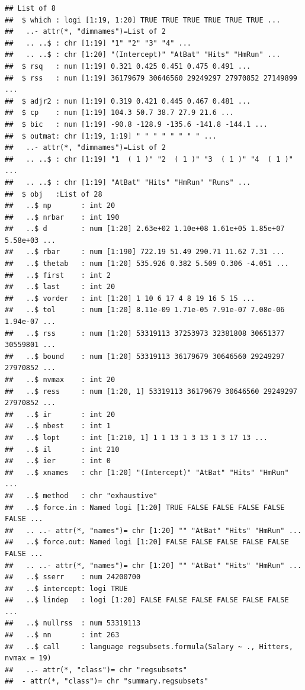 \documentclass[
  12pt,
]{book}
\theoremstyle{definition}
\theoremstyle{definition}
\theoremstyle{definition}
\theoremstyle{remark}
\begin{document}
\begin{verbatim}
## List of 8
##  $ which : logi [1:19, 1:20] TRUE TRUE TRUE TRUE TRUE TRUE ...
##   ..- attr(*, "dimnames")=List of 2
##   .. ..$ : chr [1:19] "1" "2" "3" "4" ...
##   .. ..$ : chr [1:20] "(Intercept)" "AtBat" "Hits" "HmRun" ...
##  $ rsq   : num [1:19] 0.321 0.425 0.451 0.475 0.491 ...
##  $ rss   : num [1:19] 36179679 30646560 29249297 27970852 27149899 ...
##  $ adjr2 : num [1:19] 0.319 0.421 0.445 0.467 0.481 ...
##  $ cp    : num [1:19] 104.3 50.7 38.7 27.9 21.6 ...
##  $ bic   : num [1:19] -90.8 -128.9 -135.6 -141.8 -144.1 ...
##  $ outmat: chr [1:19, 1:19] " " " " " " " " ...
##   ..- attr(*, "dimnames")=List of 2
##   .. ..$ : chr [1:19] "1  ( 1 )" "2  ( 1 )" "3  ( 1 )" "4  ( 1 )" ...
##   .. ..$ : chr [1:19] "AtBat" "Hits" "HmRun" "Runs" ...
##  $ obj   :List of 28
##   ..$ np       : int 20
##   ..$ nrbar    : int 190
##   ..$ d        : num [1:20] 2.63e+02 1.10e+08 1.61e+05 1.85e+07 5.58e+03 ...
##   ..$ rbar     : num [1:190] 722.19 51.49 290.71 11.62 7.31 ...
##   ..$ thetab   : num [1:20] 535.926 0.382 5.509 0.306 -4.051 ...
##   ..$ first    : int 2
##   ..$ last     : int 20
##   ..$ vorder   : int [1:20] 1 10 6 17 4 8 19 16 5 15 ...
##   ..$ tol      : num [1:20] 8.11e-09 1.71e-05 7.91e-07 7.08e-06 1.94e-07 ...
##   ..$ rss      : num [1:20] 53319113 37253973 32381808 30651377 30559801 ...
##   ..$ bound    : num [1:20] 53319113 36179679 30646560 29249297 27970852 ...
##   ..$ nvmax    : int 20
##   ..$ ress     : num [1:20, 1] 53319113 36179679 30646560 29249297 27970852 ...
##   ..$ ir       : int 20
##   ..$ nbest    : int 1
##   ..$ lopt     : int [1:210, 1] 1 1 13 1 3 13 1 3 17 13 ...
##   ..$ il       : int 210
##   ..$ ier      : int 0
##   ..$ xnames   : chr [1:20] "(Intercept)" "AtBat" "Hits" "HmRun" ...
##   ..$ method   : chr "exhaustive"
##   ..$ force.in : Named logi [1:20] TRUE FALSE FALSE FALSE FALSE FALSE ...
##   .. ..- attr(*, "names")= chr [1:20] "" "AtBat" "Hits" "HmRun" ...
##   ..$ force.out: Named logi [1:20] FALSE FALSE FALSE FALSE FALSE FALSE ...
##   .. ..- attr(*, "names")= chr [1:20] "" "AtBat" "Hits" "HmRun" ...
##   ..$ sserr    : num 24200700
##   ..$ intercept: logi TRUE
##   ..$ lindep   : logi [1:20] FALSE FALSE FALSE FALSE FALSE FALSE ...
##   ..$ nullrss  : num 53319113
##   ..$ nn       : int 263
##   ..$ call     : language regsubsets.formula(Salary ~ ., Hitters, nvmax = 19)
##   ..- attr(*, "class")= chr "regsubsets"
##  - attr(*, "class")= chr "summary.regsubsets"
\end{verbatim}
\end{document}
